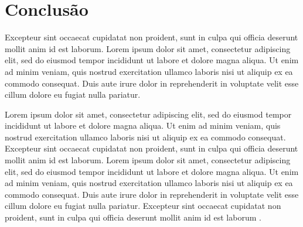 
\section{Conclusão}

Excepteur sint occaecat cupidatat non proident, sunt in culpa qui officia deserunt mollit anim id est laborum. Lorem ipsum dolor sit amet, consectetur adipiscing elit, sed do eiusmod tempor incididunt ut labore et dolore magna aliqua. Ut enim ad minim veniam, quis nostrud exercitation ullamco laboris nisi ut aliquip ex ea commodo consequat. Duis aute irure dolor in reprehenderit in voluptate velit esse cillum dolore eu fugiat nulla pariatur. 

Lorem ipsum dolor sit amet, consectetur adipiscing elit, sed do eiusmod tempor incididunt ut labore et dolore magna aliqua. Ut enim ad minim veniam, quis nostrud exercitation ullamco laboris nisi ut aliquip ex ea commodo consequat. Excepteur sint occaecat cupidatat non proident, sunt in culpa qui officia deserunt mollit anim id est laborum. Lorem ipsum dolor sit amet, consectetur adipiscing elit, sed do eiusmod tempor incididunt ut labore et dolore magna aliqua. Ut enim ad minim veniam, quis nostrud exercitation ullamco laboris nisi ut aliquip ex ea commodo consequat. Duis aute irure dolor in reprehenderit in voluptate velit esse cillum dolore eu fugiat nulla pariatur. Excepteur sint occaecat cupidatat non proident, sunt in culpa qui officia deserunt mollit anim id est laborum \citep{ref5}.
